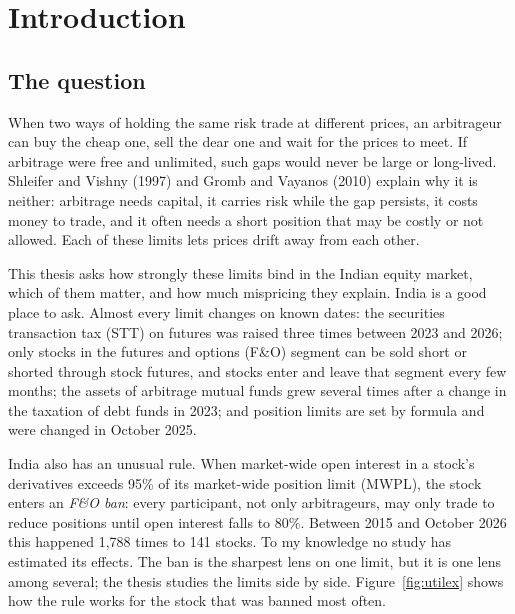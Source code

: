 \chapter{Introduction}\label{ch:intro}

\section{The question}
When two ways of holding the same risk trade at different prices, an arbitrageur can buy the cheap one, sell the dear one
and wait for the prices to meet. If arbitrage were free and unlimited, such gaps would never be large or long-lived.
Shleifer and Vishny (1997) and Gromb and Vayanos (2010) explain why it is neither: arbitrage needs capital, it carries
risk while the gap persists, it costs money to trade, and it often needs a short position that may be costly or not
allowed. Each of these limits lets prices drift away from each other.

This thesis asks how strongly these limits bind in the Indian equity market, which of them matter, and how much
mispricing they explain. India is a good place to ask. Almost every limit changes on known dates: the securities
transaction tax (STT) on futures was raised three times between 2023 and 2026; only stocks in the futures and options
(F\&O) segment can be sold short or shorted through stock futures, and stocks enter and leave that segment every few
months; the assets of arbitrage mutual funds grew several times after a change in the taxation of debt funds in 2023; and
position limits are set by formula and were changed in October 2025.

India also has an unusual rule. When market-wide open interest in a stock's derivatives exceeds 95\% of its market-wide
position limit (MWPL), the stock enters an \emph{F\&O ban}: every participant, not only arbitrageurs, may only trade to
reduce positions until open interest falls to 80\%. Between 2015 and October 2026 this happened 1,788 times to 141 stocks.
To my knowledge no study has estimated its effects. The ban is the sharpest lens on one limit, but it is one lens among
several; the thesis studies the limits side by side. Figure~\ref{fig:utilex} shows how the rule works for the stock that
was banned most often.

